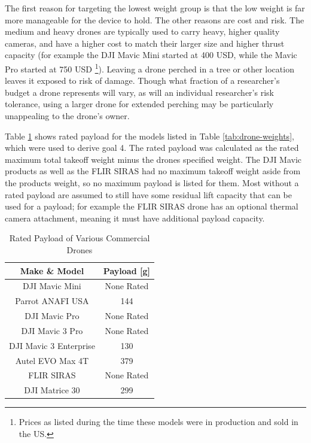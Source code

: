 The first reason for targeting the lowest weight group is that the low weight is far more
manageable for the device to hold. The other reasons are cost and risk. The medium and heavy drones are typically used to carry
heavy, higher quality cameras, and have a higher cost to match their larger size and higher thrust capacity
(for example the DJI Mavic Mini started at 400 USD, while the Mavic Pro started at 750 USD
\footnote{Prices as listed during the time these models were in production and sold in the US.}).
Leaving a drone perched in a tree or other location leaves it exposed to risk of damage.
Though what fraction of a researcher's budget a drone represents will vary, as will an 
individual researcher's risk tolerance, using a larger drone for extended perching may be 
particularly unappealing to the drone's owner.

Table \ref{tab:payload} shows rated payload for the models listed in Table \ref{tab:drone-weights}, which 
were used to derive goal 4.
The rated payload was calculated as the rated maximum total takeoff weight minus the drones specified weight. 
The DJI Mavic products as well as the FLIR SIRAS had no maximum takeoff weight aside from the products weight, 
so no maximum payload is listed for them. Most without a rated payload are assumed to still have some
residual lift capacity that can be used for a payload; for example the FLIR SIRAS drone has an optional
thermal camera attachment, meaning it must have additional payload capacity.

\begin{table}[H]
    \centering
    \caption{Rated Payload of Various Commercial Drones}
    \begin{tabular}{| c || c |}
        \hline
        {Make \& Model} & Payload [g] \\
        \hline
        DJI Mavic Mini & None Rated \\
        Parrot ANAFI USA & 144 \\
        DJI Mavic Pro & None Rated \\
        DJI Mavic 3 Pro & None Rated \\
        DJI Mavic 3 Enterprise & 130 \\
        Autel EVO Max 4T & 379 \\
        FLIR SIRAS & None Rated \\
        DJI Matrice 30 & 299 \\
        \hline
    \end{tabular}
    \label{tab:payload}
\end{table}

